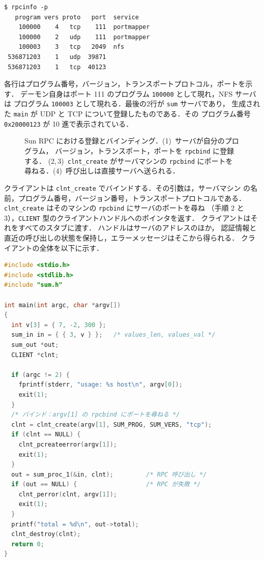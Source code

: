 \documentclass[../main.tex]{subfiles}
\begin{document}
\begin{lstlisting}[numbers=none]
$ rpcinfo -p
   program vers proto   port  service
    100000    4   tcp    111  portmapper
    100000    2   udp    111  portmapper
    100003    3   tcp   2049  nfs
 536871203    1   udp  39871
 536871203    1   tcp  40123
\end{lstlisting}

各行はプログラム番号，バージョン，トランスポートプロトコル，ポートを示す．
デーモン自身はポート 111 のプログラム \texttt{100000} として現れ，NFS サーバは
プログラム \texttt{100003} として現れる．最後の2行が \texttt{sum} サーバであり，
生成された \texttt{main} が UDP と TCP について登録したものである．その
プログラム番号 \texttt{0x20000123} が 10 進で表示されている．

\begin{figure}[htbp]
  \centering
  
  \caption{Sun RPC における登録とバインディング．(1)~サーバが自分のプログラム，
    バージョン，トランスポート，ポートを \texttt{rpcbind} に登録する．
    (2,\,3)~\texttt{clnt\_create} がサーバマシンの \texttt{rpcbind} にポートを
    尋ねる．(4)~呼び出しは直接サーバへ送られる．}
  \label{fig:l13-rpcbind}
\end{figure}

クライアントは \texttt{clnt\_create} でバインドする．その引数は，サーバマシン
の名前，プログラム番号，バージョン番号，トランスポートプロトコルである．
\texttt{clnt\_create} はそのマシンの \texttt{rpcbind} にサーバのポートを尋ね
（手順 2 と 3），\texttt{CLIENT} 型のクライアントハンドルへのポインタを返す．
クライアントはそれをすべてのスタブに渡す．%
ハンドルはサーバのアドレスのほか，
認証情報と直近の呼び出しの状態を保持し，エラーメッセージはそこから得られる．
クライアントの全体を以下に示す．

\begin{lstlisting}[language=C, numbers=none]
#include <stdio.h>
#include <stdlib.h>
#include "sum.h"

int main(int argc, char *argv[])
{
  int v[3] = { 7, -2, 300 };
  sum_in in = { { 3, v } };   /* values_len, values_val */
  sum_out *out;
  CLIENT *clnt;

  if (argc != 2) {
    fprintf(stderr, "usage: %s host\n", argv[0]);
    exit(1);
  }
  /* バインド：argv[1] の rpcbind にポートを尋ねる */
  clnt = clnt_create(argv[1], SUM_PROG, SUM_VERS, "tcp");
  if (clnt == NULL) {
    clnt_pcreateerror(argv[1]);
    exit(1);
  }
  out = sum_proc_1(&in, clnt);         /* RPC 呼び出し */
  if (out == NULL) {                   /* RPC が失敗 */
    clnt_perror(clnt, argv[1]);
    exit(1);
  }
  printf("total = %d\n", out->total);
  clnt_destroy(clnt);
  return 0;
}
\end{lstlisting}
\end{document}

